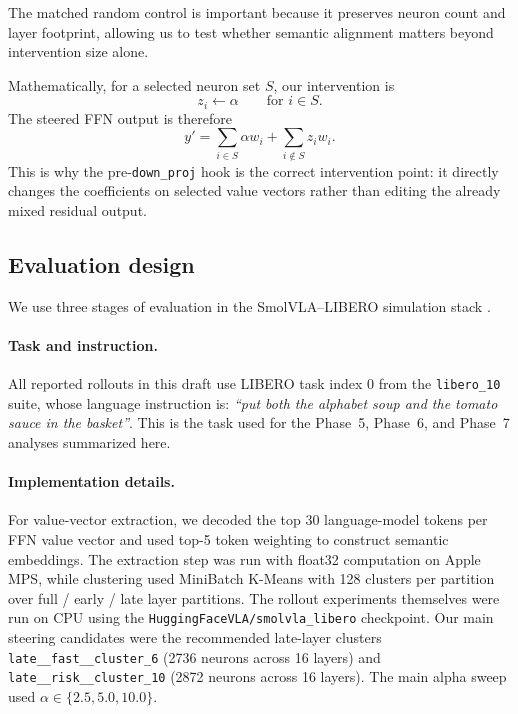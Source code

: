 \documentclass[11pt]{article}
\begin{document}
The matched random control is important because it preserves neuron count and layer footprint, allowing us to test whether semantic alignment matters beyond intervention size alone.

Mathematically, for a selected neuron set $S$, our intervention is
\begin{equation}
z_i \leftarrow \alpha \qquad \text{for } i \in S.
\label{eq:steering-rule}
\end{equation}
The steered FFN output is therefore
\begin{equation}
y' = \sum_{i \in S} \alpha w_i + \sum_{i \notin S} z_i w_i.
\label{eq:steered-output}
\end{equation}
This is why the pre-\texttt{down\_proj} hook is the correct intervention point: it directly changes the coefficients on selected value vectors rather than editing the already mixed residual output.

\subsection{Evaluation design}

We use three stages of evaluation in the SmolVLA--LIBERO simulation stack \citep{huggingfacevla2025smolvla_libero,liu2023libero,zhu2020robosuite,todorov2012mujoco}.

\paragraph{Task and instruction.}
All reported rollouts in this draft use LIBERO task index 0 from the \texttt{libero\_10} suite, whose language instruction is: \emph{``put both the alphabet soup and the tomato sauce in the basket''}. This is the task used for the Phase~5, Phase~6, and Phase~7 analyses summarized here.

\paragraph{Implementation details.}
For value-vector extraction, we decoded the top 30 language-model tokens per FFN value vector and used top-5 token weighting to construct semantic embeddings. The extraction step was run with float32 computation on Apple MPS, while clustering used MiniBatch K-Means with 128 clusters per partition over full / early / late layer partitions. The rollout experiments themselves were run on CPU using the \texttt{HuggingFaceVLA/smolvla\_libero} checkpoint. Our main steering candidates were the recommended late-layer clusters \texttt{late\_\_fast\_\_cluster\_6} (2736 neurons across 16 layers) and \texttt{late\_\_risk\_\_cluster\_10} (2872 neurons across 16 layers). The main alpha sweep used $\alpha \in \{2.5, 5.0, 10.0\}$.
\end{document}
